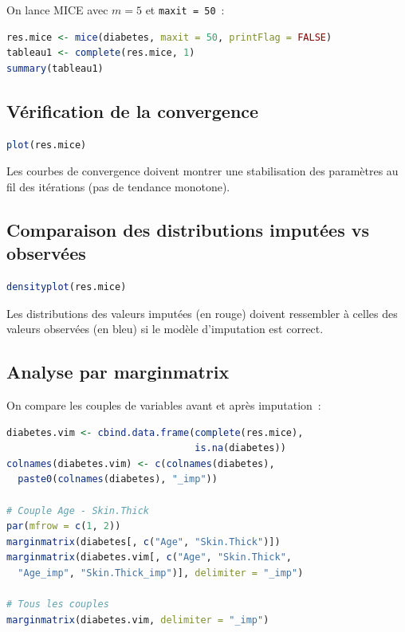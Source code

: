 \documentclass[a4paper,11pt]{article}
\theoremstyle{definition}
\theoremstyle{remark}
\begin{document}
On lance MICE avec $m = 5$ et \texttt{maxit = 50}~:

\begin{lstlisting}[language=R]
res.mice <- mice(diabetes, maxit = 50, printFlag = FALSE)
tableau1 <- complete(res.mice, 1)
summary(tableau1)
\end{lstlisting}

\subsection{V\'erification de la convergence}

\begin{lstlisting}[language=R]
plot(res.mice)
\end{lstlisting}

Les courbes de convergence doivent montrer une stabilisation des
param\`etres au fil des it\'erations (pas de tendance monotone).

\subsection{Comparaison des distributions imput\'ees vs observ\'ees}

\begin{lstlisting}[language=R]
densityplot(res.mice)
\end{lstlisting}

Les distributions des valeurs imput\'ees (en rouge) doivent
ressembler \`a celles des valeurs observ\'ees (en bleu) si le
mod\`ele d'imputation est correct.

\subsection{Analyse par marginmatrix}

On compare les couples de variables avant et apr\`es imputation~:

\begin{lstlisting}[language=R]
diabetes.vim <- cbind.data.frame(complete(res.mice),
                                 is.na(diabetes))
colnames(diabetes.vim) <- c(colnames(diabetes),
  paste0(colnames(diabetes), "_imp"))

# Couple Age - Skin.Thick
par(mfrow = c(1, 2))
marginmatrix(diabetes[, c("Age", "Skin.Thick")])
marginmatrix(diabetes.vim[, c("Age", "Skin.Thick",
  "Age_imp", "Skin.Thick_imp")], delimiter = "_imp")

# Tous les couples
marginmatrix(diabetes.vim, delimiter = "_imp")
\end{lstlisting}
\end{document}
